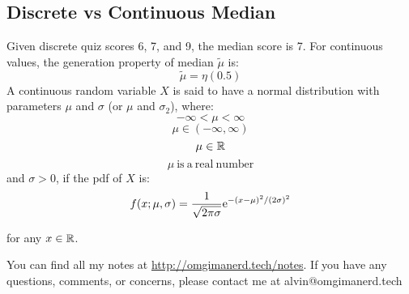 \documentclass[letterpaper, 12pt]{math}
\begin{document}
\subsection*{Discrete vs Continuous Median}
Given discrete quiz scores 6, 7, and 9, the median score is 7. For continuous
values, the generation property of median \( \tilde{\mu} \) is:
\[ \tilde{\mu} = \eta(0.5) \]
A continuous random variable \( X \) is said to have a normal distribution
with parameters \( \mu \) and \( \sigma \) (or \( \mu \) and \( \sigma_{2} \)),
where:
\[ -\infty < \mu < \infty \]
\[ \mu\in(-\infty,\infty) \]
\[ \mu\in\mathbb{R} \]
\[ \mu\ \mathrm{is\ a\ real\ number} \]
and \( \sigma > 0 \), if the pdf of \( X \) is:
\[ f(x;\mu,\sigma) =
   \frac{1}{\sqrt{2\pi\sigma}}\mathrm{e}^{-(x-\mu)^{2}/(2\sigma)^{2}} \]
\begin{center}
  for any \( x\in\mathbb{R} \).
\end{center}

\begin{center}
  You can find all my notes at \url{http://omgimanerd.tech/notes}. If you have
  any questions, comments, or concerns, please contact me at
  alvin@omgimanerd.tech
\end{center}
\end{document}
